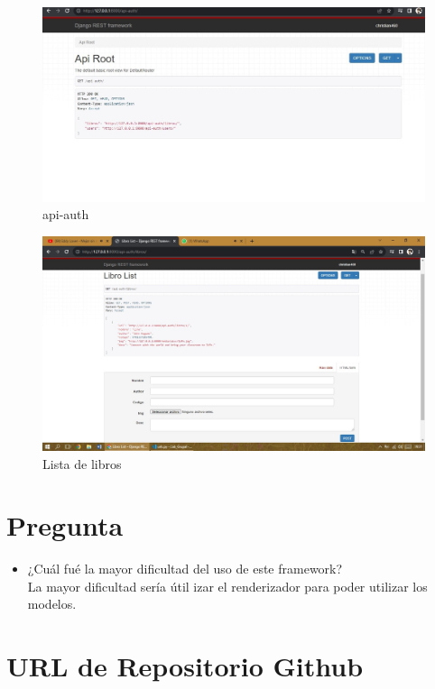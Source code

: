 \documentclass{article}
\begin{document}
	\begin{figure}[h]
		\centering
		\includegraphics[width=\textwidth]{img/api-auth.jpeg}
		\caption{api-auth}
	\end{figure}
	
	\begin{figure}[h]
		\centering
		\includegraphics[width=\textwidth]{img/api-auth-libros.jpeg}
		\caption{Lista de libros}
	\end{figure}
	
	
	\section{Pregunta}
	
	\begin{itemize}
		\item ¿Cuál fué la mayor dificultad del uso de este framework?\\
		La mayor dificultad sería útil izar el renderizador para poder utilizar los modelos.
	\end{itemize}
	
	\section{URL de Repositorio Github}
	
\end{document}
